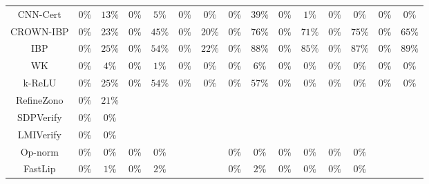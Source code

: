 \begin{table*}
{\begin{tabular}{c|c|c|c|c|c|c|c|c|c|c|c|c|c|c}
     CNN-Cert &         $0\%$ &        $13\%$ &         $0\%$ &         $5\%$ &         $0\%$ &         $0\%$ &         $0\%$ &        $39\%$ &         $0\%$ &         $1\%$ &         $0\%$ &         $0\%$ &         $0\%$ &         $0\%$ \\
    CROWN-IBP &         $0\%$ &        $23\%$ &         $0\%$ &        $45\%$ &         $0\%$ &        $20\%$ &         $0\%$ &        $76\%$ &         $0\%$ &        $71\%$ &         $0\%$ &        $75\%$ &         $0\%$ &        $65\%$ \\
          IBP &         $0\%$ &        $25\%$ &         $0\%$ &        $54\%$ &         $0\%$ &        $22\%$ &         $0\%$ &        $88\%$ &         $0\%$ &        $85\%$ &         $0\%$ &        $87\%$ &         $0\%$ &        $89\%$ \\
           WK &         $0\%$ &         $4\%$ &         $0\%$ &         $1\%$ &         $0\%$ &         $0\%$ &         $0\%$ &         $6\%$ &         $0\%$ &         $0\%$ &         $0\%$ &         $0\%$ &         $0\%$ &         $0\%$ \\
       k-ReLU &         $0\%$ &        $25\%$ &         $0\%$ &        $54\%$ &         $0\%$ &         $0\%$ &         $0\%$ &        $57\%$ &         $0\%$ &         $0\%$ &         $0\%$ &         $0\%$ &         $0\%$ &         $0\%$ \\
   RefineZono &         $0\%$ &        $21\%$ &               &               &               &               &               &               &               &               &               &               &               &               \\
    SDPVerify &         $0\%$ &         $0\%$ &               &               &               &               &               &               &               &               &               &               &               &               \\
    LMIVerify &         $0\%$ &         $0\%$ &               &               &               &               &               &               &               &               &               &               &               &               \\
      Op-norm &         $0\%$ &         $0\%$ &         $0\%$ &         $0\%$ &               &               &         $0\%$ &         $0\%$ &         $0\%$ &         $0\%$ &         $0\%$ &         $0\%$ &               &               \\
      FastLip &         $0\%$ &         $1\%$ &         $0\%$ &         $2\%$ &               &               &         $0\%$ &         $2\%$ &         $0\%$ &         $0\%$ &         $0\%$ &         $0\%$ &               &               \\

\end{tabular}}
\end{table*}
